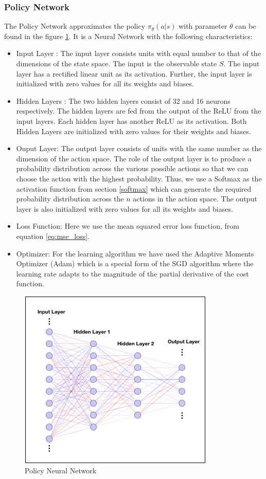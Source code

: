 \documentclass[12pt]{extarticle}
\numberwithin{equation}{section}
\begin{document}
	\subsubsection{Policy Network}
	
	The Policy Network approximates the policy $\pi_{\theta}(a| s)$ with parameter $\theta$ can be found in the figure \ref{nn-policy}. It is a Neural Network with the following characteristics:
	\begin{itemize}
		\item Input Layer : The input layer consists units with equal number to that of the dimensions of the state space. The input is the observable state $S$. The input layer has a rectified linear unit as its activation. Further, the input layer is initialized with zero values for all its weights and biases. 
		\item Hidden Layers : The two hidden layers consist of 32 and 16 neurons respectively. The hidden layers are fed from the output of the ReLU from the input layers. Each hidden layer has another ReLU as its activation. Both Hidden Layers are initialized with zero values for their weights and biases.
		\item Ouput Layer: The output layer consists of units with the same number as the dimension of the action space. The role of the output layer is to produce a probability distribution across the various possible actions so that we can choose the action with the highest probability. Thus, we use a Softmax as the activation function from section \ref{softmax} which can generate the required probability distribution across the $n$ actions in the action space. The output layer is also initialized with zero values for all its weights and biases.
		\item Loss Function: Here we use the mean squared error loss function, from equation \eqref{eq:mse_loss}.
		\item Optimizer: For the learning algorithm we have used the Adaptive Moments Optimizer (Adam)\cite{kingma2014adam} which is a special form of the SGD algorithm where the learning rate adapts to the magnitude of the partial derivative of the cost function. 
	\end{itemize}
	\begin{figure}[h]
		\vspace{0.2cm}
		\centering
		\includegraphics[scale=0.6]{nn-actor}
		\caption{Policy Neural Network
			\label{nn-policy}}
	\end{figure}
\end{document}
